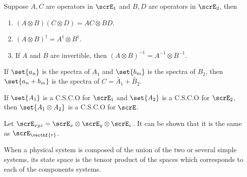 \begin{proposition}
    Suppose \(A,C\) are operators in \(\scrE_1\) and \(B,D\) are operators in \(\scrE_2\), then 
    \begin{enumerate}
        \item \((A \otimes B)(C \otimes D) = AC \otimes BD\).
        \item \((A \otimes B)^{\dagger} = A^{\dagger} \otimes B^{\dagger}\).
        \item If \(A\) and \(B\) are invertible, then \((A \otimes B)^{-1} = A^{-1} \otimes B^{-1}\).
    \end{enumerate}
\end{proposition}
If \(\set{a_n}\) is the spectra of \(A_1\) and \(\set{b_m}\) is the spectra of \(B_2\), then \(\set{a_n + b_m}\) is the spectra of \(C = \tilde{A_1} + \tilde{B_2}\). 

If \(\set{A_1}\) is a C.S.C.O for \(\scrE_1\) and \(\set{A_2}\) is a C.S.C.O for \(\scrE_2\), then \(\set{A_1 \otimes A_2}\) is a C.S.C.O for \(\scrE\).

Let \(\scrE_{xyz} = \scrE_x \otimes \scrE_y \otimes \scrE_z\). It can be shown that it is the same as \(\scrE_{\vectbf{r}}\). 

When a physical system is composed of the union of the two or several simple systems, its state space is the tensor product of the spaces which corresponds to each of the components systems.